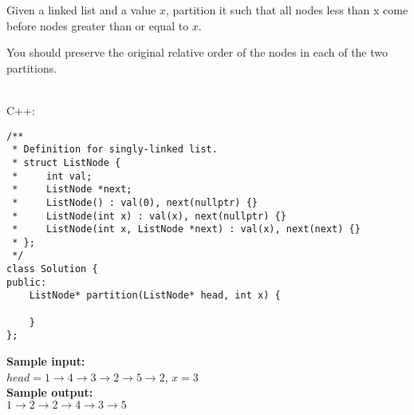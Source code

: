 \documentclass[a4paper]{article}
\begin{document}
Given a linked list and a value $x$, partition it such that all nodes less than x come before nodes greater than or equal to $x$.

You should preserve the original relative order of the nodes in each of the two partitions.

\ \\

\noindent C++:

\begin{lstlisting}[style=C++]
/**
 * Definition for singly-linked list.
 * struct ListNode {
 *     int val;
 *     ListNode *next;
 *     ListNode() : val(0), next(nullptr) {}
 *     ListNode(int x) : val(x), next(nullptr) {}
 *     ListNode(int x, ListNode *next) : val(x), next(next) {}
 * };
 */
class Solution {
public:
    ListNode* partition(ListNode* head, int x) {
        
    }
};
\end{lstlisting}

\LINE

\noindent \textbf{Sample input:}\\
$head = 1 \rightarrow 4 \rightarrow 3 \rightarrow 2 \rightarrow 5 \rightarrow 2$, $x=3$\\

\noindent \textbf{Sample output:}\\
$1 \rightarrow 2 \rightarrow 2 \rightarrow 4 \rightarrow 3 \rightarrow 5$\\
\end{document}
